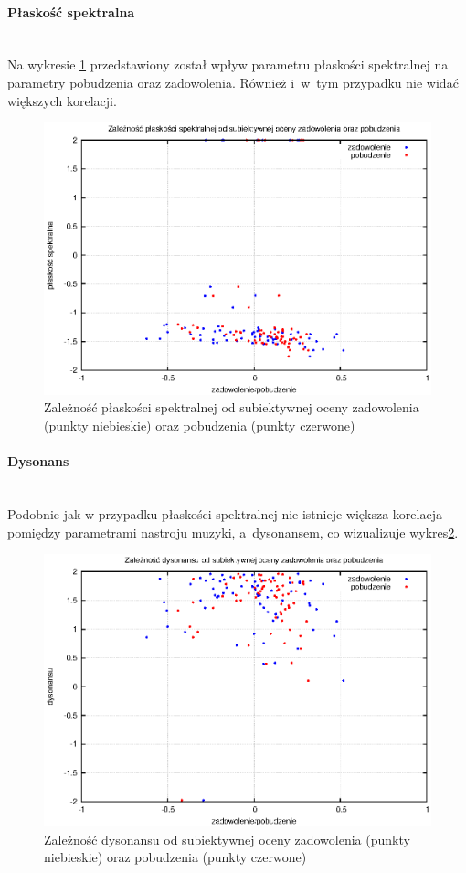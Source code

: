 \paragraph{Płaskość spektralna}\mbox{}\\
Na wykresie \ref{wykresFlatness} przedstawiony został wpływ parametru płaskości spektralnej na parametry pobudzenia oraz zadowolenia. Również i~w~tym przypadku nie widać większych korelacji.
\begin{figure}[ht!]
\centering
\includegraphics[scale=\imageSize]{res/flatness.eps}
\caption{Zależność płaskości spektralnej od subiektywnej oceny zadowolenia (punkty niebieskie) oraz pobudzenia (punkty czerwone)\label{wykresFlatness}}
\end{figure}

\paragraph{Dysonans}\mbox{}\\
Podobnie jak w przypadku płaskości spektralnej nie istnieje większa korelacja pomiędzy parametrami nastroju muzyki, a~dysonansem, co wizualizuje wykres\ref{wykresDissonance}.
\begin{figure}[ht!]
\centering
\includegraphics[scale=\imageSize]{res/dissonance.eps}
\caption{Zależność dysonansu od subiektywnej oceny zadowolenia (punkty niebieskie) oraz pobudzenia (punkty czerwone)\label{wykresDissonance}}
\end{figure}

